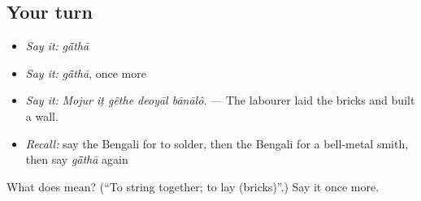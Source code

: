 \subsection*{Your turn}
\begin{itemize}
\raggedright
  \item \emph{Say it:} \emph{gā̃thā}
  \item \emph{Say it:} \emph{gā̃thā}, once more
  \item \emph{Say it:} \emph{Mojur iṭ gẽthe deoyāl bānālô.} — The labourer laid the bricks and built a wall.
  \item \emph{Recall:} say the Bengali for to solder, then the Bengali for a bell-metal smith, then say \emph{gā̃thā} again
\end{itemize}

\begin{tcolorbox}[breakable,colback=teal!4,colframe=teal!35!black,title={Before you move on}]
What does  mean? (\textquotedblleft{}To string together; to lay (bricks)\textquotedblright{}.) Say it once more.
\end{tcolorbox}
